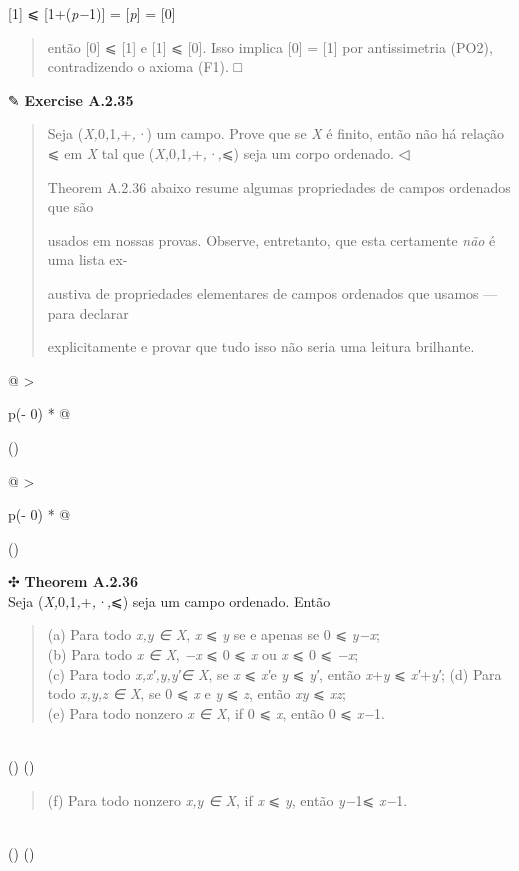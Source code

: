 \documentclass[
]{article}
\begin{document}
{[}1{]} ⩽ {[}1+(\emph{p−}1){]} = {[}\emph{p}{]} = {[}0{]}

\begin{quote}
então {[}0{]} ⩽ {[}1{]} e {[}1{]} ⩽ {[}0{]}. Isso implica {[}0{]} =
{[}1{]} por antissimetria (PO2), contradizendo o axioma (F1). □
\end{quote}

✎ \textbf{Exercise A.2.35}

\begin{quote}
Seja (\emph{X,}0\emph{,}1\emph{,}+\emph{,·}) um campo. Prove que se
\emph{X} é finito, então não há relação ⩽ em \emph{X} tal que
(\emph{X,}0\emph{,}1\emph{,}+\emph{,·,}⩽) seja um corpo ordenado. ◁

Theorem A.2.36 abaixo resume algumas propriedades de campos ordenados
que são

usados em nossas provas. Observe, entretanto, que esta certamente
\emph{não} é uma lista ex-

austiva de propriedades elementares de campos ordenados que usamos ---
para declarar

explicitamente e provar que tudo isso não seria uma leitura brilhante.
\end{quote}

\begin{longtable}[]{@{}
  >{\raggedright\arraybackslash}p{(\columnwidth - 0\tabcolsep) * }@{}}
\toprule()
\begin{minipage}[b]{\linewidth}\raggedright
\begin{longtable}[]{@{}
  >{\raggedright\arraybackslash}p{(\columnwidth - 0\tabcolsep) * }@{}}
\toprule()
\begin{minipage}[b]{\linewidth}\raggedright
✣ \textbf{Theorem A.2.36}\\
Seja (\emph{X,}0\emph{,}1\emph{,}+\emph{,·,}⩽) seja um campo ordenado.
Então

\begin{quote}
(a) Para todo \emph{x,y ∈ X}, \emph{x} ⩽ \emph{y} se e apenas se 0 ⩽
\emph{y−x};\\
(b) Para todo \emph{x ∈ X}, \emph{−x} ⩽ 0 ⩽ \emph{x} ou \emph{x} ⩽ 0 ⩽
\emph{−x};\\
(c) Para todo \emph{x,x′,y,y′∈ X}, se \emph{x} ⩽ \emph{x′}e \emph{y} ⩽
\emph{y′}, então \emph{x}+\emph{y} ⩽ \emph{x′}+\emph{y′}; (d) Para todo
\emph{x,y,z ∈ X}, se 0 ⩽ \emph{x} e \emph{y} ⩽ \emph{z}, então \emph{xy}
⩽ \emph{xz};\\
(e) Para todo nonzero \emph{x ∈ X}, if 0 ⩽ \emph{x}, então 0 ⩽
\emph{x−}1.
\end{quote}\strut
\end{minipage} \\
\midrule()
\endhead
\bottomrule()
\end{longtable}

\begin{quote}
(f) Para todo nonzero \emph{x,y ∈ X}, if \emph{x} ⩽ \emph{y}, então
\emph{y−}1⩽ \emph{x−}1.
\end{quote}\strut
\end{minipage} \\
\midrule()
\endhead
\bottomrule()
\end{longtable}
\end{document}
